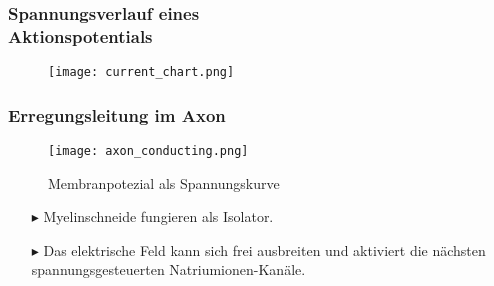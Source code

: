 \documentclass[ngerman]{beamer}
\begin{document}
\begin{frame}\frametitle{ Spannungsverlauf eines\\Aktionspotentials }
	
\begin{figure}[h]
	\centering
	\texttt{[image: current\_chart.png]}
\end{figure}
	
\end{frame}

\begin{frame}\frametitle{ Erregungsleitung im Axon }
\begin{multicols}{2}
\begin{figure}[h]
	\texttt{[image: axon\_conducting.png]}
	\caption{Membranpotezial als Spannungskurve}
\end{figure}
\columnbreak

\begin{itemize}
	\item[$\blacktriangleright$] Myelinschneide fungieren als Isolator.
	\item[$\blacktriangleright$] Das elektrische Feld kann sich frei ausbreiten und aktiviert die nächsten spannungsgesteuerten Natriumionen-Kanäle.
\end{itemize}

\end{multicols}
\end{frame}

\end{document}
